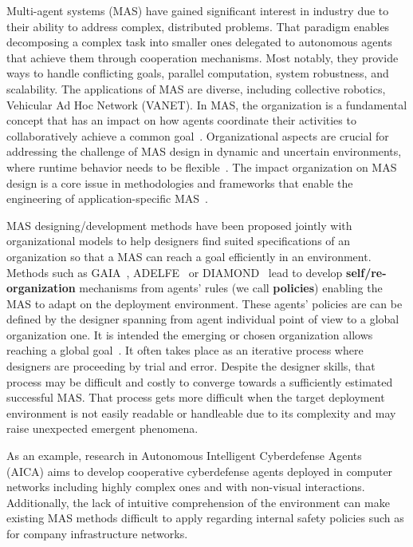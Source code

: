 \documentclass[runningheads]{llncs}
\begin{document}
Multi-agent systems (MAS) have gained significant interest in industry due to their ability to address complex, distributed problems. That paradigm enables decomposing a complex task into smaller ones delegated to autonomous agents that achieve them through cooperation mechanisms. Most notably, they provide ways to handle conflicting goals, parallel computation, system robustness, and scalability. The applications of MAS are diverse, including collective robotics, Vehicular Ad Hoc Network (VANET)\cite{Oliveira1999, Gembarski2020}.
In MAS, the organization is a fundamental concept that has an impact on how agents coordinate their activities to collaboratively achieve a common goal~\cite{Hubner2002}.
Organizational aspects are crucial for addressing the challenge of MAS design in dynamic and uncertain environments, where runtime behavior needs to be flexible~\cite{Kathleen2020}. The impact organization on MAS design is a core issue in methodologies and frameworks that enable the engineering of application-specific MAS~\cite{Bakliwal2018}.

MAS designing/development methods have been proposed jointly with organizational models to help designers find suited specifications of an organization so that a MAS can reach a goal efficiently in an environment. Methods such as GAIA~\cite{Wooldridge2000}, ADELFE~\cite{Bernon2003} or DIAMOND~\cite{Jamont2005} lead to develop \textbf{self/re-organization} mechanisms from agents' rules (we call \textbf{policies}) enabling the MAS to adapt on the deployment environment.
These agents' policies are can be defined by the designer spanning from agent individual point of view to a global organization one. It is intended the emerging or chosen organization allows reaching a global goal~\cite{Picard2009}. It often takes place as an iterative process where designers are proceeding by trial and error. Despite the designer skills, that process may be difficult and costly to converge towards a sufficiently estimated successful MAS. That process gets more difficult when the target deployment environment is not easily readable or handleable due to its complexity and may raise unexpected emergent phenomena.

As an example, research in Autonomous Intelligent Cyberdefense Agents~\cite{Kott2023} (AICA) aims to develop cooperative cyberdefense agents deployed in computer networks including highly complex ones and with non-visual interactions. Additionally, the lack of intuitive comprehension of the environment can make existing MAS methods difficult to apply regarding internal safety policies such as for company infrastructure networks.
\end{document}
